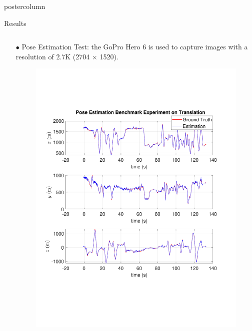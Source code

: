 \documentclass{beamer}
\begin{document}
\begin{frame}
\begin{columns}
\begin{column}{.57\textwidth}
\begin{beamercolorbox}[center]{postercolumn}
\begin{minipage}{.98\textwidth}
{\begin{myblock}{Results}
\begin{minipage}[0.3\textheight]{\textwidth}
\begin{columns}[T]
\begin{column}{0.33\textwidth}
\begin{enumerate}[label=,labelindent=\parindent,leftmargin=*]
\item[$\bullet$] Pose Estimation Test: the GoPro Hero 6 is used
to capture images with a resolution of 2.7K (2704 × 1520).
\begin{figure}
\centering
\includegraphics[width=1.0\textwidth]{img/xyz_new}

\end{figure}
\end{enumerate}
\end{column}
\end{columns}
\end{minipage}
\end{myblock}}
\end{minipage}
\end{beamercolorbox}
\end{column}
\end{columns}
\end{frame}
\end{document}
